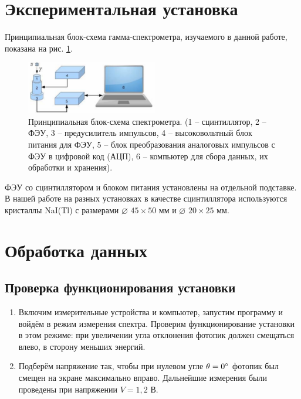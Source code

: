 \documentclass[a4paper,12pt]{article}
\begin{document}
\section{Экспериментальная установка}
Принципиальная блок-схема гамма-спектрометра, изучаемого в данной
работе, показана на рис. \hyperref[fig: Exp setup]{1}.
\begin{figure}[H]\label{fig: Exp setup}
    \centering
    \includegraphics[width = 0.51\textwidth]{Exp setup.png}
    \caption{Принципиальная блок-схема спектрометра. (1 -- сцинтиллятор, 2 --       ФЭУ, 3 -- предусилитель импульсов, 4 -- высоковольтный блок питания для       ФЭУ, 5 -- блок преобразования аналоговых импульсов с ФЭУ в цифровой код       (АЦП), 6 -- компьютер для сбора данных, их обработки и хранения).}
\end{figure}

ФЭУ со сцинтиллятором и блоком питания установлены на отдельной подставке. В нашей работе на разных установках в качестве сцинтиллятора используются кристаллы NaI(Tl) с размерами $\varnothing$ $45\times50$ мм и $\varnothing$ $20\times25$ мм.


\section{Обработка данных}

\subsection{Проверка функционирования установки}
\begin{enumerate}
    \item
    Включим измерительные устройства и компьютер, запустим программу и войдём в режим измерения спектра. Проверим функционирование установки в этом режиме: при увеличении угла отклонения фотопик должен смещаться влево, в сторону меньших энергий.
    \item 
    Подберём напряжение так, чтобы при нулевом угле $\theta =0\degree$ фотопик был смещен на экране максимально вправо. Дальнейшие измерения были проведены при напряжении $V = 1,2$ В.
\end{enumerate}
\end{document}
